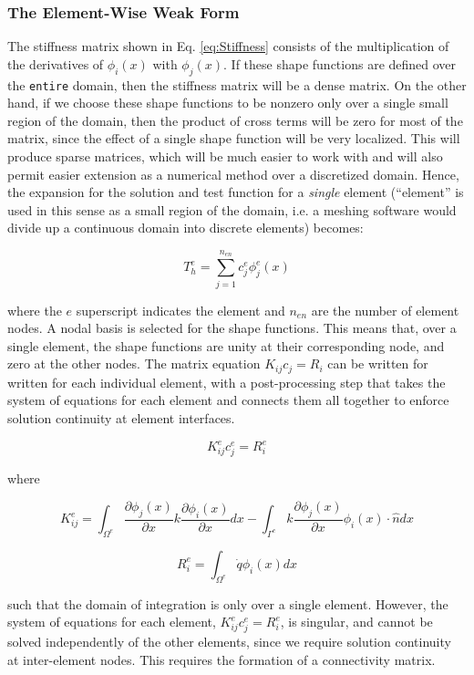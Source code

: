 \documentclass[10pt]{article}
\newcommand{\beq}{\begin{equation}}
\newcommand{\eeq}{\end{equation}}
\begin{document}
\subsubsection{The Element-Wise Weak Form}
The stiffness matrix shown in Eq. \eqref{eq:Stiffness} consists of the multiplication of the derivatives of \(\phi_i(x)\) with \(\phi_j(x)\). If these shape functions are defined over the {\tt entire} domain, then the stiffness matrix will be a dense matrix. On the other hand, if we choose these shape functions to be nonzero only over a single small region of the domain, then the product of cross terms will be zero for most of the matrix, since the effect of a single shape function will be very localized. This will produce sparse matrices, which will be much easier to work with and will also permit easier extension as a numerical method over a discretized domain. Hence, the expansion for the solution and test function for a {\it single} element (``element'' is used in this sense as a small region of the domain, i.e. a meshing software would divide up a continuous domain into discrete elements) becomes:

\beq
T_h^e=\sum_{j=1}^{n_{en}}c_j^e\phi_j^e(x)
\eeq

where the \(e\) superscript indicates the element and \(n_{en}\) are the number of element nodes. A nodal basis is selected for the shape functions. This means that, over a single element, the shape functions are unity at their corresponding node, and zero at the other nodes. The matrix equation \(K_{ij}c_j=R_i\) can be written for written for each individual element, with a post-processing step that takes the system of equations for each element and connects them all together to enforce solution continuity at element interfaces. 

\beq
K_{ij}^ec_j^e=R_i^e
\eeq

where

\beq
K_{ij}^e=\int_{\Omega^e}\frac{\partial \phi_j(x)}{\partial x}k\frac{\partial\phi_i(x)}{\partial x}dx-\int_{\Gamma^e}k\frac{\partial \phi_j(x)}{\partial x}\phi_i(x)\cdot\hat{n}dx
\eeq

\beq
R_{i}^e=\int_{\Omega^e}\dot{q}\phi_i(x)dx
\eeq

such that the domain of integration is only over a single element. However, the system of equations for each element, \(K_{ij}^ec_j^e=R_i^e\), is singular, and cannot be solved independently of the other elements, since we require solution continuity at inter-element nodes. This requires the formation of a connectivity matrix.
\end{document}
